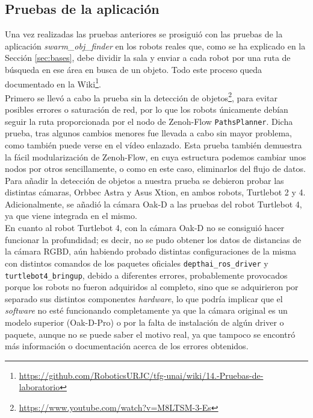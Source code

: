 \subsection{Pruebas de la aplicación}
\label{sec:pruebas_app}

Una vez realizadas las pruebas anteriores se prosiguió con las pruebas de la
aplicación \textit{swarm\_obj\_finder} en los robots reales que, como se ha
explicado en la Sección \ref{sec:bases}, debe dividir la sala y enviar a cada
robot por una ruta de búsqueda en ese área en busca de un objeto.
Todo este proceso queda documentado en la Wiki\footnote{
\href{https://github.com/RoboticsURJC/tfg-unai/wiki/14.-Pruebas-de-laboratorio-\%5B27-Nov-\%E2\%80\%90-Hoy\%5D}{https://github.com/RoboticsURJC/tfg-unai/wiki/14.-Pruebas-de-laboratorio}}.
\\

Primero se llevó a cabo la prueba sin la detección de objetos\footnote{
\href{https://www.youtube.com/watch?v=M8LTSM-3-Es}{https://www.youtube.com/watch?v=M8LTSM-3-Es}},
para evitar posibles errores o saturación de red, por lo que los robots
únicamente debían seguir la ruta proporcionada por el nodo de Zenoh-Flow
\verb|PathsPlanner|.
Dicha prueba, tras algunos cambios menores fue llevada a cabo sin mayor
problema, como también puede verse en el vídeo enlazado.
Esta prueba también demuestra la fácil modularización de Zenoh-Flow, en cuya
estructura podemos cambiar unos nodos por otros sencillamente, o como en este
caso, eliminarlos del flujo de datos.
\\

Para añadir la detección de objetos a nuestra prueba se debieron probar las
distintas cámaras, Orbbec Astra y Asus Xtion, en ambos robots, Turtlebot 2 y 4.
Adicionalmente, se añadió la cámara Oak-D a las pruebas del robot Turtlebot 4,
ya que viene integrada en el mismo.
\\

En cuanto al robot Turtlebot 4, con la cámara Oak-D no se consiguió hacer
funcionar la profundidad; es decir, no se pudo obtener los datos de distancias
de la cámara RGBD, aún habiendo probado distintas configuraciones de la misma
con distintos comandos de los paquetes oficiales \texttt{depthai\_ros\_driver} y
\texttt{turtlebot4\_bringup}, debido a diferentes errores, probablemente
provocados porque los robots no fueron adquiridos al completo, sino que se
adquirieron por separado sus distintos componentes \textit{hardware}, lo que
podría implicar que el \textit{software} no esté funcionando completamente ya
que la cámara original es un modelo superior (Oak-D-Pro) o por la falta de
instalación de algún driver o paquete, aunque no se puede saber el motivo real,
ya que tampoco se encontró más información o documentación acerca de los errores
obtenidos.
\\

